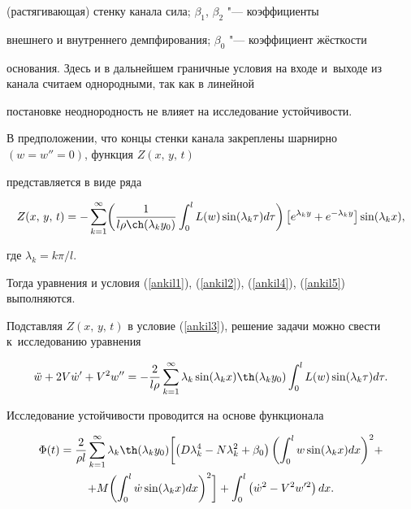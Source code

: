 (растягивающая) стенку канала сила; $\beta _1$, $\beta_2$ "--- коэффициенты

внешнего и внутреннего демпфирования; $\beta_0 $ "--- коэффициент жёсткости

основания. Здесь и в дальнейшем граничные условия на входе и~выходе из канала считаем однородными, так как в линейной

постановке неоднородность не влияет на исследование устойчивости.



В предположении, что концы стенки канала закреплены шарнирно $(w =w''= 0)$, функция $Z (x,\,y,\,t)$

представляется в виде ряда

$$

Z (x,\,y,\,t) = - \sum\limits_{k = 1}^{\infty}  \biggl(

\frac{1}{l \rho \ch (\lambda_k y_0 )} \int_0^l L (w) \sin (\lambda_k

\tau ) d \tau \biggr)\left[ e^{\lambda _k y} +

 e^{ - \lambda_k y} \right] \sin (\lambda_k x ),

$$

где $\lambda_{k} = {{k \pi} }/{{l}}$.

Тогда уравнения и условия (\ref{ankil1}), (\ref{ankil2}), (\ref{ankil4}), (\ref{ankil5}) выполняются. 

Подставляя $Z (x,\,y,\,t)$ в условие (\ref{ankil3}), решение задачи можно свести к~исследованию уравнения

\begin{equation}

\label{ankil6}

\ddot {w} + 2V \dot {w}'+ V^2 w'' = - \frac{2}{l\rho } \sum \limits_{k = 1}^{\infty}  \lambda_k \sin (\lambda_k x ) \th (\lambda_k y_0)

\int _0^l L (w) \sin (\lambda_k \tau)d \tau.

\end{equation}



Исследование устойчивости проводится на основе функционала

\begin{multline*}

\Phi ( t) = \frac{2}{\rho l}\sum\limits_{k = 1}^\infty \lambda_k \th (\lambda _k y_0) 

\biggl[ \left( D\lambda _k^4 - N \lambda _k^2 + \beta_0  \right)

\biggl( \int_0^l w \sin (\lambda_k x )dx \biggr)^2 +\\

 + M \biggl(\int_0^l \dot w \sin (\lambda_k x)dx  \biggr)^2\biggr] + \int_0^l \left( \dot {w}^2 - V^2 w'^2

\right)dx.

\end{multline*}

